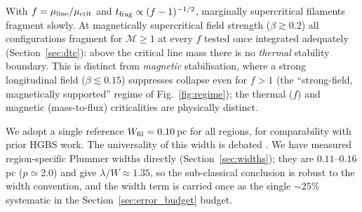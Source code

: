 \documentclass[usenatbib,twoside,twocolumn]{mnras}
\begin{document}
With $f=\mu_{\rm line}/\mu_{\rm crit}$ and $t_{\rm frag}\propto(f-1)^{-1/2}$, marginally supercritical filaments fragment slowly. At magnetically supercritical field strength ($\beta\gtrsim0.2$) all configurations fragment for $\mathcal{M}\geq1$ at every $f$ tested once integrated adequately (Section~\ref{sec:dtc}): above the critical line mass there is no \emph{thermal} stability boundary. This is distinct from \emph{magnetic} stabilisation, where a strong longitudinal field ($\beta\lesssim0.15$) suppresses collapse even for $f>1$ (the ``strong-field, magnetically supported'' regime of Fig.~\ref{fig:regime}); the thermal ($f$) and magnetic (mass-to-flux) criticalities are physically distinct.

We adopt a single reference $W_{\rm fil}=0.10$\,pc for all regions, for comparability with prior HGBS work. The universality of this width is debated \citep{Panopoulou2017,Panopoulou2022}. We have measured region-specific Plummer widths directly (Section~\ref{sec:widths}); they are $0.11$--$0.16$\,pc ($p\simeq2.0$) and give $\lambda/W\approx1.35$, so the sub-classical conclusion is robust to the width convention, and the width term is carried once as the single $\sim25\%$ systematic in the Section~\ref{sec:error_budget} budget.
\end{document}
